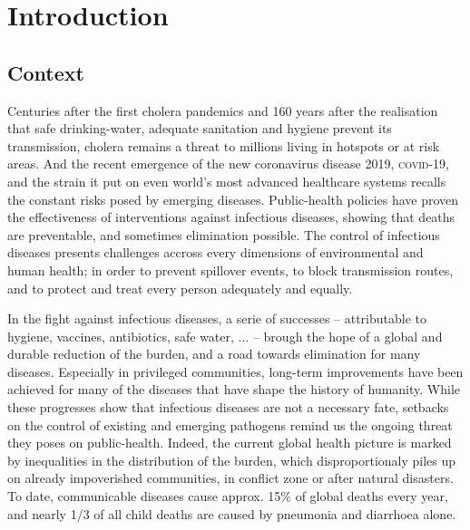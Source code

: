 \chapter*{Introduction} 

 \section{Context}
 Centuries after the first cholera pandemics and 160 years after the realisation that safe drinking-water, adequate sanitation and hygiene prevent its transmission, cholera remains a threat to millions living in hotspots or at risk areas. And the recent emergence of the new coronavirus disease 2019, \textsc{covid}-19, and the strain it put on even world's most advanced healthcare systems recalls the constant risks posed by emerging diseases. Public-health policies have proven the effectiveness of interventions against infectious diseases, showing that deaths are preventable, and sometimes elimination possible. The control of infectious diseases presents challenges accross every dimensions of environmental and human health; in order to prevent spillover events, to block transmission routes, and to protect and treat every person adequately and equally. 

In the fight against infectious diseases, a serie of successes -- attributable to \eg hygiene, vaccines, antibiotics, safe water, ... -- brough the hope of a global and durable reduction of the burden, and a road towards elimination for many diseases. Especially in privileged communities, long-term improvements have been achieved for many of the diseases that have shape the history of humanity. While these progresses show that infectious diseases are not a necessary fate, setbacks on the control of existing and emerging pathogens remind us the ongoing threat they poses on public-health. Indeed, the current global health picture is marked by inequalities in the distribution of the burden, which disproportionaly piles up on already impoverished communities, in conflict zone or after natural disasters. To date, communicable diseases cause approx. 15\% of global deaths every year\cite[-4\baselineskip][tab. 1, excl. non-transmissible neonatal and maternal diseases and nutritional diseases; pre-\textsc{covid}-19 estimates]{Roth:GlobalRegionalNational:2018}, and nearly 1/3 of all child deaths are caused by pneumonia and diarrhoea alone\cite[][\textsc{M} deaths among under 5, every year.]{WHO:EndingPreventableChild:2013}.
 
